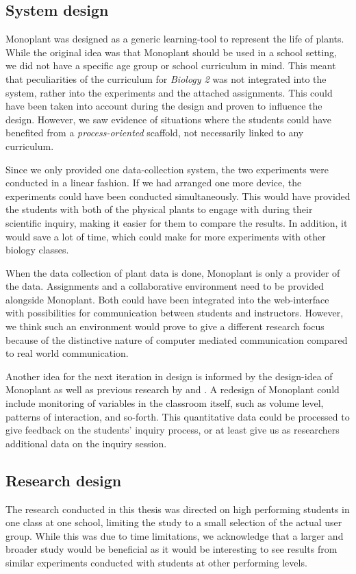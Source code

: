 \subsection{System design}
Monoplant was designed as a generic learning-tool to represent the life of plants. While the original idea was that Monoplant should be used in a school setting, we did not have a specific age group or school curriculum in mind. This meant that peculiarities of the curriculum for \emph{Biology 2} was not integrated into the system, rather into the experiments and the attached assignments. This could have been taken into account during the design and proven to influence the design. However, we saw evidence of situations where the students could have benefited from a \emph{process-oriented} scaffold, not necessarily linked to any curriculum.

Since we only provided one data-collection system, the two experiments were conducted in a linear fashion. If we had arranged one more device, the experiments could have been conducted simultaneously. This would have provided the students with both of the physical plants to engage with during their scientific inquiry, making it easier for them to compare the results. In addition, it would save a lot of time, which could make for more experiments with other biology classes. 

When the data collection of plant data is done, Monoplant is only a provider of the data. Assignments and a collaborative environment need to be provided alongside Monoplant. Both could have been integrated into the web-interface with possibilities for communication between students and instructors. However, we think such an environment would prove to give a different research focus because of the distinctive nature of computer mediated communication compared to real world communication. 

Another idea for the next iteration in design is informed by the design-idea of Monoplant as well as previous research by \citet{fischer1991critics} and \citet{furberg2009socio}. A redesign of Monoplant could include monitoring of variables in the classroom itself, such as volume level, patterns of interaction, and so-forth. This quantitative data could be processed to give feedback on the students' inquiry process, or at least give us as researchers additional data on the inquiry session.

\subsection{Research design}
The research conducted in this thesis was directed on high performing students in one class at one school, limiting the study to a small selection of the actual user group. While this was due to time limitations, we acknowledge that a larger and broader study would be beneficial as it would be interesting to see results from similar experiments conducted with students at other performing levels.

